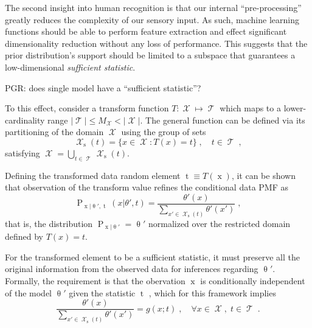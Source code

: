 \documentclass[12pt]{article}
\DeclareMathOperator{\xrm}{\mathrm{x}}
\DeclareMathOperator{\srm}{\mathrm{s}}
\DeclareMathOperator{\trm}{\mathrm{t}}
\DeclareMathOperator{\Prm}{\mathrm{P}}
\DeclareMathOperator{\Xcal}{\mathcal{X}}
\DeclareMathOperator{\Tcal}{\mathcal{T}}
\begin{document}
The second insight into human recognition is that our internal ``pre-processing'' greatly reduces the complexity of our sensory input. As such, machine learning functions should be able to perform feature extraction and effect significant dimensionality reduction without any loss of performance. This suggests that the prior distribution's support should be limited to a subspace that guarantees a low-dimensional \emph{sufficient statistic}.

PGR: does single model have a ``sufficient statistic''?

To this effect, consider a transform function $T: \Xcal \mapsto \Tcal$ which maps to a lower-cardinality range $|\Tcal| \leq M_{\Xcal} < |\Xcal|$. The general function can be defined via its partitioning of the domain $\Xcal$ using the group of sets 
\begin{equation}
\Xcal_{\srm}(t) = \big\{ x \in \Xcal : T(x) = t \big\} \;, \quad t \in \Tcal \;,
\end{equation}
satisfying $\Xcal = \bigcup_{t \in \Tcal} \Xcal_{\srm}(t)$. 

Defining the transformed data random element $\trm \equiv T(\xrm)$, it can be shown that observation of the transform value refines the conditional data PMF as
\begin{equation}
\Prm_{\xrm | \uptheta',\trm}(x | \theta',t) = \frac{\theta'(x)}{\sum_{x' \in \Xcal_{\srm}(t)} \theta'(x')} \;,
\end{equation}
that is, the distribution $\Prm_{\xrm | \uptheta'}= \uptheta'$ normalized over the restricted domain defined by $T(x) = t$. 

For the transformed element to be a sufficient statistic, it must preserve all the original information from the observed data for inferences regarding $\uptheta'$. Formally, the requirement is that the obervation $\xrm$ is conditionally independent of the model $\uptheta'$ given the statistic $\trm$ \cite{kay-est}, which for this framework implies 
\begin{equation}
\frac{\theta'(x)}{\sum_{x' \in \Xcal_{\srm}(t)} \theta'(x')} = g(x;t) \;, \quad \forall x \in \Xcal, \; t \in \Tcal \;.
\end{equation}
\end{document}
